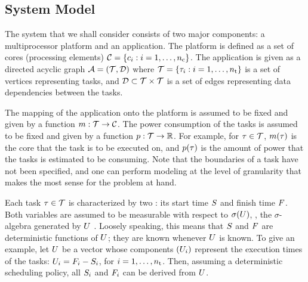 \subsection{System Model}

The system that we shall consider consists of two major components: a
multiprocessor platform and an application. The platform is defined as a set of
cores (processing elements) $\mathcal{C} = \{ c_i: i = 1, \dots, {n_\text{c}} \}$. The
application is given as a directed acyclic graph $\mathcal{A} = (\mathcal{T}, \mathcal{D})$ where
$\mathcal{T} = \{ \tau_i: i = 1, \dots, {n_\text{t}} \}$ is a set of vertices representing
tasks, and $\mathcal{D} \subset \mathcal{T} \times \mathcal{T}$ is a set of edges representing
data dependencies between the tasks.

The mapping of the application onto the platform is assumed to be fixed and
given by a function $m: \mathcal{T} \to \mathcal{C}$. The power consumption of the
tasks is assumed to be fixed and given by a function $p: \mathcal{T} \to
\mathbb{R}$. For example, for $\tau \in \mathcal{T}$, $m(\tau)$ is the core that
the task is to be executed on, and $p(\tau)$ is the amount of power that
the tasks is estimated to be consuming. Note that the boundaries of a task have
not been specified, and one can perform modeling at the level of granularity
that makes the most sense for the problem at hand.

Each task $\tau \in \mathcal{T}$ is characterized by two \rvs: its start time
$S$ and finish time $F$. Both variables are assumed to be measurable
with respect to $\sigma(U)$, \ie, the $\sigma$-algebra generated by $U$
\cite{durrett2010}. Loosely speaking, this means that $S$ and $F$
are deterministic functions of $U$; they are known whenever $U$ is known. To
give an example, let $U$ be a vector whose components $(U_i)$ represent the
execution times of the tasks: $U_i = F_i - S_i$, for $i = 1, \dots,
{n_\text{t}}$. Then, assuming a deterministic scheduling policy, all $S_i$ and
$F_i$ can be derived from $U$.
